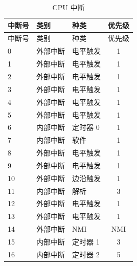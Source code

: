  \begin{longtable}[c]{ |l|l|l|c| } 

    \caption{CPU 中断}
    \label{tab:CPU-interrupt}\\
    \hline
    \rowcolor{lightgray}
   中断号 & 类别     & 种类              & 优先级    \\
    \hline
    \endfirsthead
    
    \hline
    \rowcolor{lightgray}
   中断号 & 类别      & 种类             & 优先级    \\
    \hline
    \endhead
    
    \endfoot
    
    \hline
    \endlastfoot
    
    0   & 外部中断    & 电平触发   & 1                 \\
    \hline
    1   & 外部中断    & 电平触发   & 1                 \\
    \hline
    2   & 外部中断    & 电平触发   & 1                 \\
    \hline
    3   & 外部中断    & 电平触发   & 1                 \\
    \hline
    4   & 外部中断    & 电平触发   & 1                 \\
    \hline
    5   & 外部中断    & 电平触发   & 1                 \\
    \hline
    6   & 内部中断      & 定时器 0           & 1                 \\
    \hline
    7   & 内部中断      & 软件          & 1                 \\
    \hline
    8   & 外部中断    & 电平触发   & 1                 \\
    \hline
    9   & 外部中断    & 电平触发   & 1                 \\
    \hline
    10  & 外部中断    & 边沿触发    & 1                 \\
    \hline
    11  & 内部中断      & 解析         & 3                 \\
    \hline
    12  & 外部中断    & 电平触发   & 1                 \\
    \hline
    13  & 外部中断    & 电平触发   & 1                 \\
    \hline
    14  & 外部中断    & NMI               & NMI               \\
    \hline
    15  & 内部中断      & 定时器 1           & 3                 \\
    \hline
    16  & 内部中断      & 定时器 2           & 5                 \\

\end{longtable}
